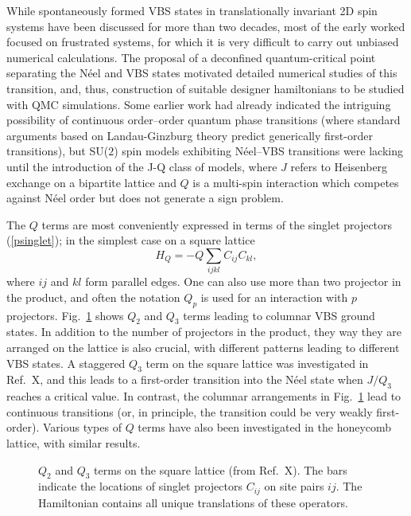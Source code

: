 \documentclass[range]{ar2e}
\begin{document}
While spontaneously formed VBS states in translationally invariant 2D spin systems have been discussed for more than two decades,\cite{Chandra88,Dagotto89,Read89}
most of the early worked focused on frustrated systems, for which it is very difficult to carry out unbiased numerical calculations. The proposal of a deconfined 
quantum-critical point separating the N\'eel and VBS states motivated detailed numerical studies of this transition, and, thus, construction of suitable designer 
hamiltonians to be studied with QMC simulations. Some earlier work had already indicated the intriguing possibility of continuous order--order quantum phase 
transitions (where
standard arguments based on Landau-Ginzburg theory predict generically first-order transitions), but SU($2$) spin models exhibiting N\'eel--VBS 
transitions were lacking until the introduction of the J-Q class of models, where $J$ refers to Heisenberg exchange on a bipartite lattice
and $Q$ is a multi-spin interaction which competes against N\'eel order but does not generate a sign problem.

The $Q$ terms are most conveniently expressed in terms of the singlet projectors (\ref{psinglet}); in the simplest case on a square lattice
\begin{equation}
H_Q = - Q\sum_{ijkl} C_{ij}C_{kl},
\end{equation}
where $ij$ and $kl$ form parallel edges. One can also use more than two projector in the product, and often the notation $Q_p$ is used for an 
interaction with $p$ projectors. Fig.~\ref{qterms} shows $Q_2$ and $Q_3$ terms leading to columnar VBS ground states. In addition to the number
of projectors in the product, they way they are arranged on the lattice is also crucial, with different patterns leading to different VBS states.
A staggered $Q_3$ term on the square lattice was investigated in Ref.~X, and this leads to a first-order transition into the N\'eel state when
$J/Q_3$ reaches a critical value. In contrast, the columnar arrangements in Fig.~\ref{qterms} lead to continuous transitions (or, in principle,
the transition could be very weakly first-order). Various types of $Q$ terms have also been investigated in the honeycomb lattice,\cite{Banerjee11} 
with similar results.

\begin{figure}
\centerline{}
\caption{$Q_2$ and $Q_3$ terms on the square lattice (from Ref.~X). The bars indicate the locations of singlet projectors 
$C_{ij}$ on site pairs $ij$. The Hamiltonian contains all unique translations of these operators.}
\label{qterms}
\end{figure}
\end{document}
